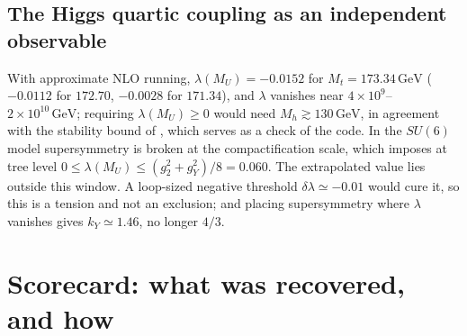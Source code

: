 \documentclass[11pt,a4paper]{article}
\newcommand{\kY}{k_Y}
\newcommand{\GeV}{\,\mathrm{GeV}}
\newcommand{\MU}{M_U}
\begin{document}
\subsection{The Higgs quartic coupling as an independent observable}
With approximate NLO running, $\lambda(\MU)=-0.0152$ for $M_t=173.34\GeV$ ($-0.0112$ for $172.70$, $-0.0028$ for $171.34$),
and $\lambda$ vanishes near $4\times10^{9}$--$2\times10^{10}\GeV$; requiring $\lambda(\MU)\ge0$ would need $M_h\gtrsim130\GeV$, in
agreement with the stability bound of \cite{Degrassi,Buttazzo}, which serves as a check of the code. In the $SU(6)$ model
supersymmetry is broken at the compactification scale, which imposes at tree level
$0\le\lambda(\MU)\le(g_2^2+g_Y^2)/8=0.060$. The extrapolated value lies outside this window. A loop-sized negative threshold
$\delta\lambda\simeq-0.01$ would cure it, so this is a tension and not an exclusion; and placing supersymmetry where $\lambda$
vanishes gives $\kY\simeq1.46$, no longer $4/3$.

\section{Scorecard: what was recovered, and how}\label{sec:score}
\end{document}

